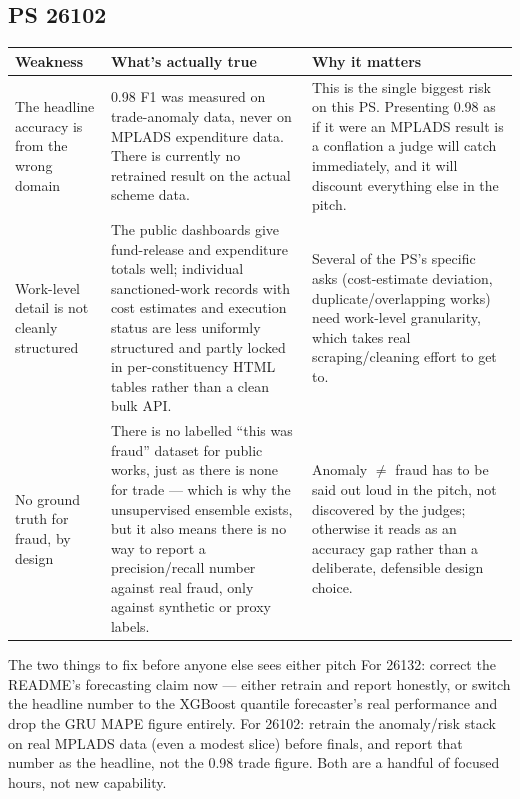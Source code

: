 \documentclass[11pt]{article}
\begin{document}
\subsection*{PS 26102}
\renewcommand{\arraystretch}{1.3}
\begin{longtable}{@{}p{4.1cm}p{7.6cm}p{3.6cm}@{}}
\toprule
\textbf{Weakness} & \textbf{What's actually true} & \textbf{Why it matters} \\
\midrule
\endhead
The headline accuracy is from the wrong domain & 0.98 F1 was measured on trade-anomaly data, never on
MPLADS expenditure data. There is currently no retrained result on the actual scheme data. & This is the
single biggest risk on this PS. Presenting 0.98 as if it were an MPLADS result is a conflation a judge will
catch immediately, and it will discount everything else in the pitch. \\[0.4em]
Work-level detail is not cleanly structured & The public dashboards give fund-release and expenditure
totals well; individual sanctioned-work records with cost estimates and execution status are less uniformly
structured and partly locked in per-constituency HTML tables rather than a clean bulk API. & Several of the
PS's specific asks (cost-estimate deviation, duplicate/overlapping works) need work-level granularity, which
takes real scraping/cleaning effort to get to. \\[0.4em]
No ground truth for fraud, by design & There is no labelled ``this was fraud'' dataset for public works,
just as there is none for trade --- which is why the unsupervised ensemble exists, but it also means there
is no way to report a precision/recall number against real fraud, only against synthetic or proxy labels. &
Anomaly $\neq$ fraud has to be said out loud in the pitch, not discovered by the judges; otherwise it reads
as an accuracy gap rather than a deliberate, defensible design choice. \\
\bottomrule
\end{longtable}

\begin{redbox}{The two things to fix before anyone else sees either pitch}
For 26132: correct the README's forecasting claim now --- either retrain and report honestly, or switch the
headline number to the XGBoost quantile forecaster's real performance and drop the GRU MAPE figure entirely.
For 26102: retrain the anomaly/risk stack on real MPLADS data (even a modest slice) before finals, and
report that number as the headline, not the 0.98 trade figure. Both are a handful of focused hours, not new
capability.
\end{redbox}
\end{document}
